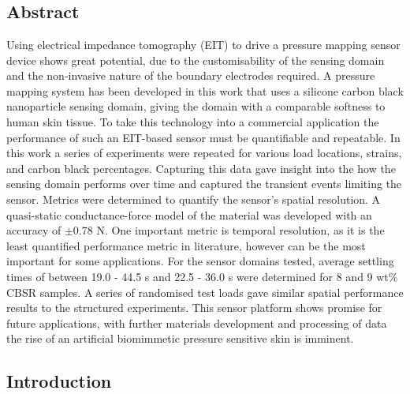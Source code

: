 \chapter{\chapivname}
\label{chapter4}



\section*{Abstract}
Using electrical impedance tomography (EIT) to drive a pressure mapping sensor device shows great potential, due to the customisability of the sensing domain and the non-invasive nature of the boundary electrodes required. A pressure mapping system has been developed in this work that uses a silicone carbon black nanoparticle sensing domain, giving the domain with a comparable softness to human skin tissue. To take this technology into a commercial application the performance of such an EIT-based sensor must be quantifiable and repeatable. In this work a series of experiments were repeated for various load locations, strains, and carbon black percentages. Capturing this data gave insight into the how the sensing domain performs over time and captured the transient events limiting the sensor. Metrics were determined to quantify the sensor's spatial resolution. A quasi-static conductance-force model of the material was developed with an accuracy of $\pm$0.78 N. One important metric is temporal resolution, as it is the least quantified performance metric in literature, however can be the most important for some applications. For the sensor domains tested, average settling times of between 19.0 - 44.5 s and 22.5 - 36.0 s were determined for 8 and 9 wt\% CBSR samples. A series of randomised test loads gave similar spatial performance results to the structured experiments. This sensor platform shows promise for future applications, with further materials development and processing of data the rise of an artificial biomimmetic pressure sensitive skin is imminent.


\section{Introduction} \label{sec:introduction}

